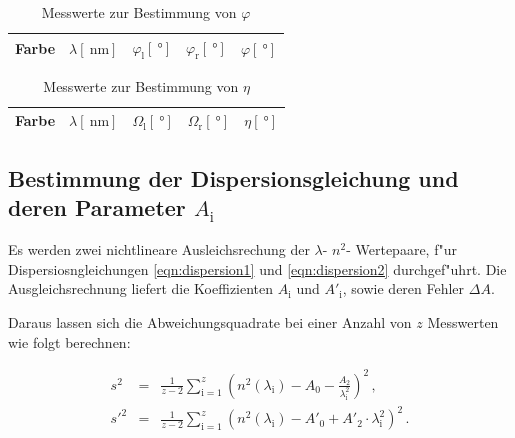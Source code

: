 		\begin{table}[h!]
			\begin{center}
				\caption{Messwerte zur Bestimmung von $\varphi$ \label{table:phi}}
				\begin{tabular}{|c|c|c|c|c|}
					\hline
						Farbe & $\lambda [\SI{}{\nano \meter}]$ & $\varphi_\mathrm{l} [\SI{}{\degree}]$ & $\varphi_\mathrm{r} [\SI{}{\degree}]$ & $\varphi [\SI{}{\degree}]$ \\
					\hline 
					\hline
						
					\hline 
				\end{tabular}
			\end{center}
		\end{table}		

		\begin{table}[h!]
			\begin{center}
				\caption{Messwerte zur Bestimmung von $\eta$ \label{table:eta}}
				\begin{tabular}{|c|c|c|c|c|}
					\hline
						Farbe & $\lambda [\SI{}{\nano \meter}]$ & $\Omega_\mathrm{l} [\SI{}{\degree}]$ & $\Omega_\mathrm{r} [\SI{}{\degree}]$ & $\eta [\SI{}{\degree}]$ \\
					\hline 
					\hline
						
					\hline 
				\end{tabular}
			\end{center}
		\end{table}		

	\clearpage

	\subsection{Bestimmung der Dispersionsgleichung und deren Parameter $A_\mathrm{i}$}
	\label{subsec:dispersionskurve}
		Es werden zwei nichtlineare Ausleichsrechung der $\lambda$- $n^2$- Wertepaare, f"ur Dispersiosngleichungen \eqref{eqn:dispersion1} und \eqref{eqn:dispersion2} durchgef"uhrt.
		Die Ausgleichsrechnung liefert die Koeffizienten $A_\mathrm{i}$ und $A'_\mathrm{i}$, sowie deren Fehler $\Delta A$.

		Daraus lassen sich die Abweichungsquadrate bei einer Anzahl von $z$ Messwerten wie folgt berechnen:

		\begin{eqnarray*}
			s^2 & = & \frac{1}{z - 2} \sum_{\mathrm{i} = 1}^z{\left(n^2(\lambda_\mathrm{i}) - A_0 - \frac{A_2}{\lambda_\mathrm{i}^2}\right)^2} \,, \\
			s'^2 & = & \frac{1}{z - 2} \sum_{\mathrm{i} = 1}^z{\left(n^2(\lambda_\mathrm{i}) - A'_0 + A'_2 \cdot \lambda_\mathrm{i}^2 \right)^2} \,. \\
		\end{eqnarray*}


